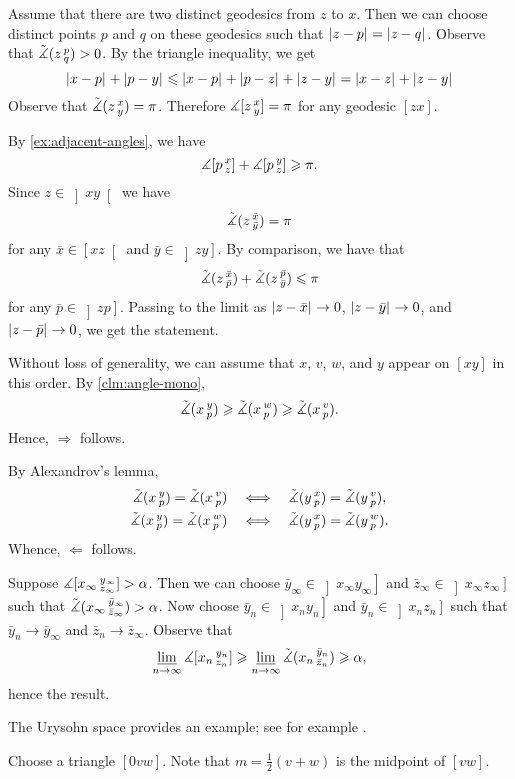 Assume that there are two distinct geodesics from $z$ to $x$.
Then we can choose distinct points $p$ and $q$ on these geodesics such that $|{z}-{p}|_{}^{{}}=|{z}-{q}|_{}^{{}}$.
Observe that $\tilde\measuredangle(z\,{}^{p}_{q})>0$.
By the triangle inequality, we get 
\[|{x}-{p}|_{}^{{}}+|{p}-{y}|_{}^{{}}\leqslant |{x}-{p}|_{}^{{}}+|{p}-{z}|_{}^{{}}+|{z}-{y}|_{}^{{}}=|{x}-{z}|_{}^{{}}+|{z}-{y}|_{}^{{}}\]
Observe that $\tilde\measuredangle(z\,{}^{x}_{y})=\pi$.
Therefore $\measuredangle[z\,{}^{x}_{y}]=\pi$ for any geodesic $[zx]$.

By \ref{ex:adjacent-angles}, we have
\[\measuredangle[p\,{}^{x}_{z}]+\measuredangle[p\,{}^{y}_{z}]\geqslant \pi.\]
Since $z\in \left]xy\right[$ we have 
\[\tilde\measuredangle(z\,{}^{\bar x}_{\bar y})=\pi\]
for any $\bar x\in \left[xz\right[$ and $\bar y\in \left]zy\right]$.
By comparison, we have that 
\[\tilde\measuredangle(z\,{}^{\bar x}_{\bar p})+\tilde\measuredangle(z\,{}^{\bar p}_{\bar y})\leqslant\pi\]
for any $\bar p\in \left]zp\right]$.
Passing to the limit as
$|{z}-{\bar x}|_{}^{{}}\to 0$,
$|{z}-{\bar y}|_{}^{{}}\to 0$, and
$|{z}-{\bar p}|_{}^{{}}\to 0$,
we get the statement.

Without loss of generality, we can assume that $x$, $v$, $w$, and $y$ appear on 
$[xy]$ in this order.
By \ref{clm:angle-mono},
\[
\tilde\measuredangle(x\,{}^{y}_{p})\geqslant \tilde\measuredangle(x\,{}^{w}_{p}) \geqslant\tilde\measuredangle(x\,{}^{v}_{p}).
\]
Hence, $\Rightarrow$ follows.

By Alexandrov's lemma,
\begin{align*}
\tilde\measuredangle(x\,{}^{y}_{p})=\tilde\measuredangle(x\,{}^{v}_{p})
\quad&\Longleftrightarrow\quad
\tilde\measuredangle(y\,{}^{x}_{p})=\tilde\measuredangle(y\,{}^{v}_{p}),
\\
\tilde\measuredangle(x\,{}^{y}_{p})=\tilde\measuredangle(x\,{}^{w}_{p})
\quad&\Longleftrightarrow\quad
\tilde\measuredangle(y\,{}^{x}_{p})=\tilde\measuredangle(y\,{}^{w}_{p}).
\end{align*}
Whence, $\Leftarrow$ follows.

 Suppose $\measuredangle [x_\infty\,{}^{y_\infty}_{z_\infty}]>\alpha$.
Then we can choose $\bar y_\infty\in\left]x_\infty y_\infty\right]$
and $\bar z_\infty\in\left]x_\infty z_\infty\right]$ such that 
$\tilde\measuredangle(x_\infty\,{}^{\bar y_\infty}_{\bar z_\infty})>\alpha$.
Now choose $\bar y_n\in\left]x_n y_n\right]$ and $\bar y_n\in\left]x_n z_n\right]$ such that $\bar y_n\to \bar y_\infty$ and $\bar z_n\to \bar z_\infty$.
Observe that 
\[\varliminf_{n\to\infty}\measuredangle [x_n\,{}^{y_n}_{z_n}]\geqslant\varliminf_{n\to\infty}\tilde\measuredangle(x_n\,{}^{\bar y_n}_{\bar z_n}) \geqslant \alpha,\]
hence the result.

The Urysohn space provides an example;
see for example \cite[Lecture 2]{petrunin2023pure}.

Choose a triangle $[0vw]$.
Note that $m=\tfrac12(v+w)$ is the midpoint of $[vw]$.

